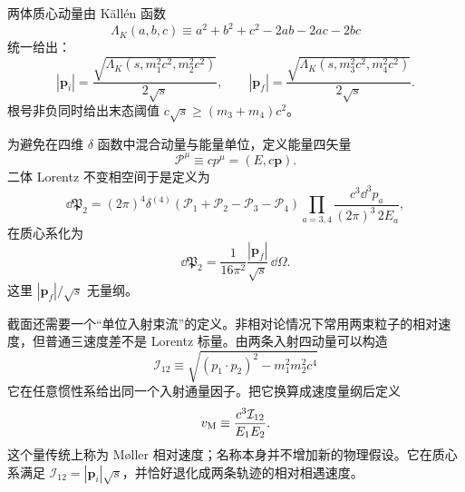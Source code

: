 两体质心动量由 Källén 函数
\begin{equation*}
 \Lambda_K(a,b,c)\equiv a^2+b^2+c^2-2ab-2ac-2bc
\end{equation*}
统一给出：
\begin{equation}
 \boxed{
 |\mathbf p_i|
 =\frac{\sqrt{\Lambda_K(s,m_1^2c^2,m_2^2c^2)}}{2\sqrt s},
 \qquad
 |\mathbf p_f|
 =\frac{\sqrt{\Lambda_K(s,m_3^2c^2,m_4^2c^2)}}{2\sqrt s}.}
 \label{eq:cm-momenta-kallen-si-r9}
\end{equation}
根号非负同时给出末态阈值 \(c\sqrt s\ge(m_3+m_4)c^2\)。

为避免在四维 \(\delta\) 函数中混合动量与能量单位，定义能量四矢量
\begin{equation*}
 \mathcal P^\mu\equiv cp^\mu=(E,c\mathbf p).
\end{equation*}
二体 Lorentz 不变相空间于是定义为
\begin{equation}
 \dd\mathfrak P_2
 =(2\pi)^4\delta^{(4)}(\mathcal P_1+\mathcal P_2-\mathcal P_3-\mathcal P_4)
 \prod_{a=3,4}\frac{c^3\dd^3 p_a}{(2\pi)^3\,2E_a},
 \label{eq:phase2-si-start-r9}
\end{equation}
在质心系化为
\begin{equation}
 \boxed{
 \dd\mathfrak P_2
 =\frac1{16\pi^2}\frac{|\mathbf p_f|}{\sqrt s}\,\dd\Omega.}
 \label{eq:phase2-final-si-r9}
\end{equation}
这里 \(|\mathbf p_f|/\sqrt s\) 无量纲。

截面还需要一个“单位入射束流”的定义。非相对论情况下常用两束粒子的相对速度，但普通三速度差不是 Lorentz 标量。由两条入射四动量可以构造
\begin{equation}
 \mathcal I_{12}
 \equiv\sqrt{(p_1\!\cdot p_2)^2-m_1^2m_2^2c^4}
 \label{eq:invariant-flux-scalar-r9}
\end{equation}
它在任意惯性系给出同一个入射通量因子。把它换算成速度量纲后定义
\begin{equation}
 v_{\rm M}
 \equiv
 \frac{c^3\mathcal I_{12}}{E_1E_2}.
 \label{eq:moller-velocity-si-r9}
\end{equation}
这个量传统上称为 M\o ller 相对速度；名称本身并不增加新的物理假设。它在质心系满足 \(\mathcal I_{12}=|\mathbf p_i|\sqrt s\)，并恰好退化成两条轨迹的相对相遇速度。

